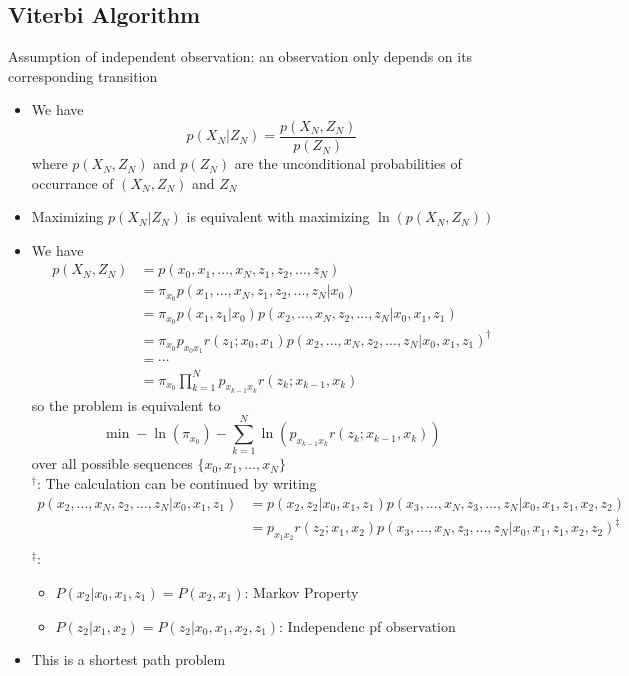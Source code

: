 \subsection{Viterbi Algorithm}
Assumption of independent observation: an observation only depends on its corresponding transition
\begin{itemize}
    \item We have
    \[
        p(X_N|Z_N) = \frac{p(X_N,Z_N)}{p(Z_N)}
    \]
    where $p(X_N,Z_N)$ and $p(Z_N)$ are the unconditional probabilities of occurrance of $(X_N,Z_N)$ and $Z_N$
    \item Maximizing $p(X_N|Z_N)$ is equivalent with maximizing $\ln (p(X_N,Z_N))$
    \item We have
    \[
        \begin{array}{ll}
            p(X_N,Z_N)  & = p(x_0,x_1,...,x_N,z_1,z_2,...,z_N)  \\
                        & = \pi_{x_0}p(x_1,...,x_N,z_1,z_2,...,z_N|x_0) \\
                        & = \pi_{x_0}p(x_1,z_1|x_0)p(x_2,...,x_N,z_2,...,z_N|x_0,x_1,z_1) \\
                        & = \pi_{x_0}p_{x_0 x_1}r(z_1;x_0,x_1)p(x_2,...,x_N,z_2,...,z_N|x_0,x_1,z_1)^\dagger \\
                        & = \cdots \\
                        & = \pi_{x_0} \prod _{k=1}^N p_{x_{k-1}x_k} r(z_k;x_{k-1},x_k) 
        \end{array}
    \]
    so the problem is equivalent to 
    \[
        \min -\ln (\pi_{x_0}) - \sum_{k=1}^N \ln (p_{x_{k-1}x_k} r(z_k;x_{k-1},x_k))
    \]
    over all possible sequences $\{x_0,x_1,...,x_N\}$ \\
    $^\dagger$: The calculation can be continued by writing
    \[
        \begin{array}{ll}
            p(x_2,...,x_N,z_2,...,z_N|x_0,x_1,z_1) & = p(x_2,z_2 | x_0,x_1,z_1)p(x_3,...,x_N,z_3,...,z_N|x_0,x_1,z_1,x_2,z_2) \\
            & =p_{x_1x_2} r(z_2;x_1,x_2) p(x_3,...,x_N,z_3,...,z_N|x_0,x_1,z_1,x_2,z_2)^\ddagger \\

        \end{array}
    \]
    $^\ddagger$:
    \begin{itemize}
        \item $P(x_2|x_0,x_1,z_1)=P(x_2,x_1)$: Markov Property
        \item $P(z_2|x_1,x_2)=P(z_2|x_0,x_1,x_2,z_1)$: Independenc pf observation
    \end{itemize}
    \item This is a shortest path problem
\end{itemize}

